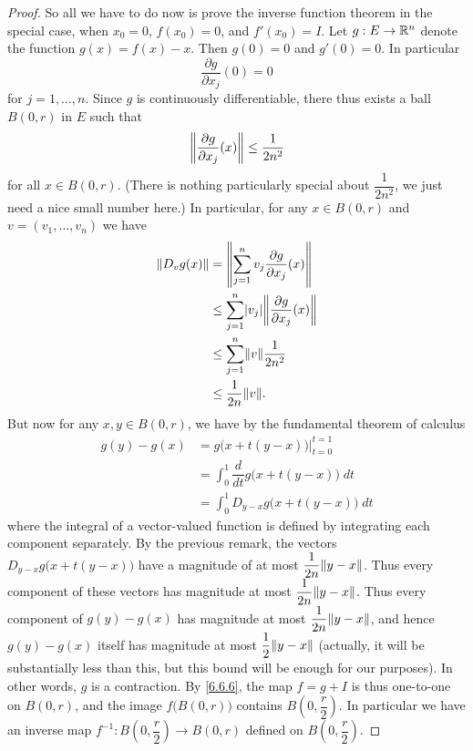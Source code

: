 \begin{proof}
  So all we have to do now is prove the inverse function theorem in the special case, when \(x_0 = 0\), \(f(x_0) = 0\), and \(f'(x_0) = I\).
  Let \(g : E \to \R^n\) denote the function \(g(x) = f(x) - x\).
  Then \(g(0) = 0\) and \(g'(0) = 0\).
  In particular
  \[
    \dfrac{\partial g}{\partial x_j}(0) = 0
  \]
  for \(j = 1, \dots, n\).
  Since \(g\) is continuously differentiable, there thus exists a ball \(B(0, r)\) in \(E\) such that
  \[
    \norm*{\dfrac{\partial g}{\partial x_j}(x)} \leq \dfrac{1}{2 n^2}
  \]
  for all \(x \in B(0, r)\).
  (There is nothing particularly special about \(\dfrac{1}{2 n^2}\), we just need a nice small number here.)
  In particular, for any \(x \in B(0, r)\) and \(v = (v_1, \dots, v_n)\) we have
  \begin{align*}
    \norm*{D_v g(x)} & = \norm*{\sum_{j = 1}^n v_j \dfrac{\partial g}{\partial x_j} (x)}         \\
                     & \leq \sum_{j = 1}^n \abs{v_j} \norm*{\dfrac{\partial g}{\partial x_j}(x)} \\
                     & \leq \sum_{j = 1}^n \norm*{v} \dfrac{1}{2 n^2}                            \\
                     & \leq \dfrac{1}{2n} \norm*{v}.
  \end{align*}
  But now for any \(x, y \in B(0, r)\), we have by the fundamental theorem of calculus
  \begin{align*}
    g(y) - g(x) & = g\big(x + t(y - x)\big) \big|_{t = 0}^{t = 1}        \\
                & = \int_0^1 \dfrac{d}{dt} g\big(x + t(y - x)\big) \; dt \\
                & = \int_0^1 D_{y - x} g\big(x + t(y - x)\big) \; dt
  \end{align*}
  where the integral of a vector-valued function is defined by integrating each component separately.
  By the previous remark, the vectors \(D_{y - x} g\big(x + t(y - x)\big)\) have a magnitude of at most \(\dfrac{1}{2n} \norm*{y - x}\).
  Thus every component of these vectors has magnitude at most \(\dfrac{1}{2n} \norm*{y - x}\).
  Thus every component of \(g(y) - g(x)\) has magnitude at most \(\dfrac{1}{2n} \norm*{y - x}\), and hence \(g(y) - g(x)\) itself has magnitude at most \(\dfrac{1}{2} \norm*{y - x}\)
  (actually, it will be substantially less than this, but this bound will be enough for our purposes).
  In other words, \(g\) is a contraction.
  By \cref{6.6.6}, the map \(f = g + I\) is thus one-to-one on \(B(0, r)\), and the image \(f\big(B(0, r)\big)\) contains \(B(0, \dfrac{r}{2})\).
  In particular we have an inverse map \(f^{-1} : B(0, \dfrac{r}{2}) \to B(0, r)\) defined on \(B(0, \dfrac{r}{2})\).


\end{proof}
